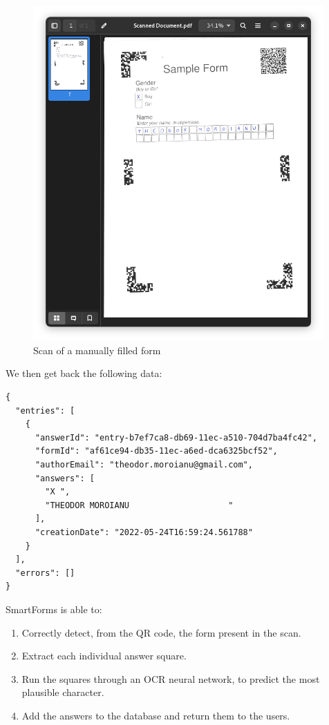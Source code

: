 \documentclass[12pt, a4paper]{report}
\begin{document}
\begin{figure}[!h]
    \centering
    \includegraphics[width=30em]{images/screenshoots/sample_form_scan.png}
    \caption{Scan of a manually filled form}
    \label{fig:label}
\end{figure}


We then get back the following data:

\begin{verbatim}
{
  "entries": [
    {
      "answerId": "entry-b7ef7ca8-db69-11ec-a510-704d7ba4fc42",
      "formId": "af61ce94-db35-11ec-a6ed-dca6325bcf52",
      "authorEmail": "theodor.moroianu@gmail.com",
      "answers": [
        "X ",
        "THEODOR MOROIANU                    "
      ],
      "creationDate": "2022-05-24T16:59:24.561788"
    }
  ],
  "errors": []
}
\end{verbatim}

SmartForms is able to:
\begin{enumerate}
    \item Correctly detect, from the QR code, the form present in the scan.
    \item Extract each individual answer square.
    \item Run the squares through an OCR neural network, to predict the most plausible character.
    \item Add the answers to the database and return them to the users.
\end{enumerate}
\end{document}
